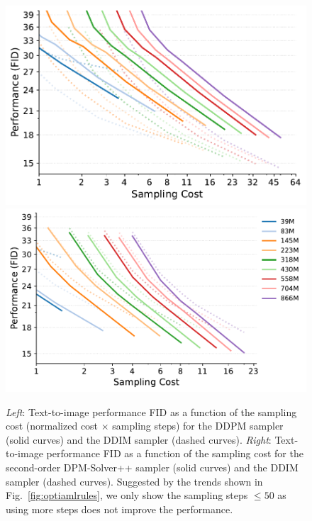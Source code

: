 \begin{figure}[ht]
    \centering
    \def\xwidth{.3\linewidth}
     \includegraphics[height=\xwidth]{cp2/figures/ddpm_analyze_inference_costs_B.pdf}
    \includegraphics[height=\xwidth]{cp2/figures/dpmsolver_plus_plus_analyze_inference_costs_B.pdf}
    \caption{\emph{Left}: Text-to-image performance FID as a function of the sampling cost (normalized cost $\times$ sampling steps) for the DDPM sampler (solid curves) and the DDIM sampler (dashed curves). \emph{Right}: Text-to-image performance FID as a function of the sampling cost for the second-order DPM-Solver++ sampler (solid curves) and the DDIM sampler (dashed curves). Suggested by the trends shown in Fig.~\ref{fig:optiamlrules}, we only show the sampling steps $\leq 50$ as using more steps does not improve the performance.}
    \label{fig:scalingsampler}
\end{figure} 





